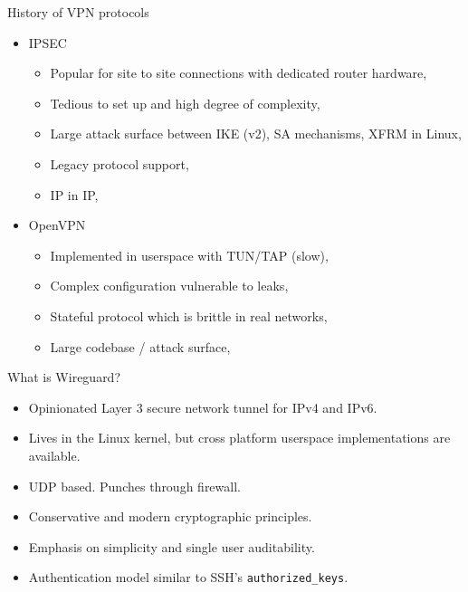\documentclass[xcolor=table]{beamer}
\begin{document}
    \begin{frame}{History of VPN protocols}
        \begin{itemize}
            \item IPSEC
                \begin{itemize}
                    \item Popular for site to site connections with dedicated router hardware,
                    \item Tedious to set up and high degree of complexity,
                    \item Large attack surface between IKE (v2), SA mechanisms, XFRM in Linux,
                    \item Legacy protocol support,
                    \item IP in IP,
                \end{itemize}
            \item OpenVPN
                \begin{itemize}
                    \item Implemented in userspace with TUN/TAP (slow),
                    \item Complex configuration vulnerable to leaks,
                    \item Stateful protocol which is brittle in real networks,
                    \item Large codebase / attack surface,
                \end{itemize}
        \end{itemize}
    \end{frame}
    \begin{frame}{What is Wireguard?}
        \begin{itemize}
            \item Opinionated Layer 3 secure network tunnel for IPv4 and IPv6.
            \item Lives in the Linux kernel, but cross platform userspace implementations are available.
            \item UDP based. Punches through firewall.
            \item Conservative and modern cryptographic principles.
            \item Emphasis on simplicity and single user auditability.
            \item Authentication model similar to SSH's \texttt{authorized\_keys}.
        \end{itemize}
    \end{frame}
\end{document}
